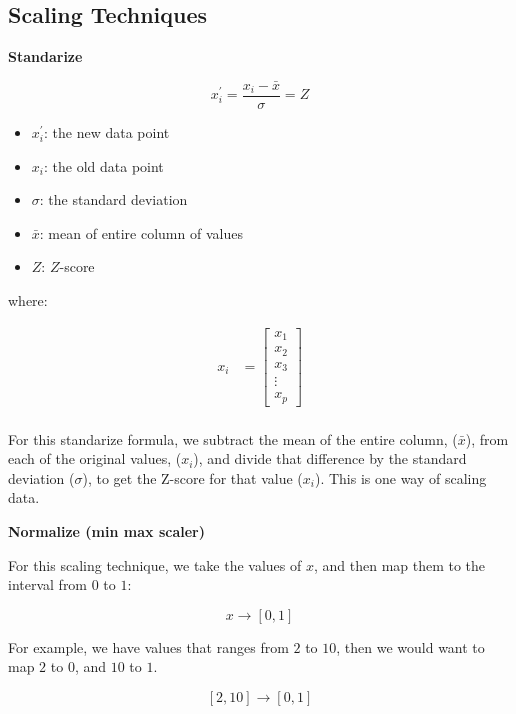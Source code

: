 \subsection{Scaling Techniques}
\begin{outline}[enumerate]
\1 \textbf{Standarize}

\[
x_i^{\prime} = \frac{x_i - \bar{x}}{\sigma} = Z
\]

\begin{itemize}
    \item $x_i^{\prime}$: the new data point  
    \item $x_i$: the old data point  
    \item $\sigma$: the standard deviation
    \item $\bar{x}$: mean of entire column of values
    \item $Z$: $Z$-score
\end{itemize}

where:

\begin{align*}
x_i &= \begin{bmatrix}
        x_{1} \\
        x_{2} \\
        x_{3} \\
        \vdots \\
        x_{p}
        \end{bmatrix} \\
\end{align*}

For this standarize formula, we subtract the mean of the entire column, ($\bar{x}$), from each of the original values, ($x_i$), and divide that difference by the standard deviation ($\sigma$), to get the
Z-score for that value ($x_i$). This is one way of scaling data.


\1 \textbf{Normalize (min max scaler)}

For this scaling technique, we take the values of $x$, and then map them to the interval from $0$ to $1$:

\[
    x \rightarrow [0,1]
\] 

For example, we have values that ranges from $2$ to $10$, then we would want to map $2$ to $0$, and $10$ to $1$.

\[
    [2,10] \rightarrow [0,1]
\] 

\begin{center}
\end{center}
\end{outline}
